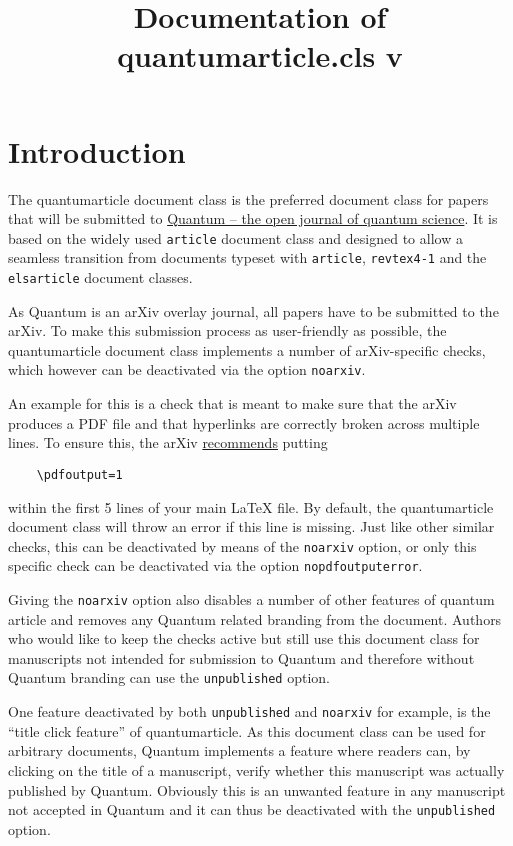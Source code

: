 \documentclass[a4paper,noarxiv,onecolumn]{quantumarticle}
\begin{document}
	\title{Documentation of quantumarticle.cls v\quantumarticleversion}
	\maketitle
	
	\tableofcontents
	
	\clearpage
	
	\section{Introduction}
	The quantumarticle document class is the preferred document class for papers that will be submitted to \href{https://quantum-journal.org/}{Quantum -- the open journal of quantum science}. It is based on the widely used \texttt{article} document class and designed to allow a seamless transition from documents typeset with \texttt{article}, \texttt{revtex4-1} and the \texttt{elsarticle} document classes. 
	
	As Quantum is an arXiv overlay journal, all papers have to be submitted to the arXiv. To make this submission process as user-friendly as possible, the quantumarticle document class implements a number of arXiv-specific checks, which however can be deactivated via the option \texttt{noarxiv}.

        An example for this is a check that is meant to make sure that the arXiv produces a PDF file and that hyperlinks are correctly broken across multiple lines.
        To ensure this, the arXiv \href{https://arxiv.org/help/submit_tex}{recommends} putting 
	\begin{verbatim}
	\pdfoutput=1
	\end{verbatim}
	within the first 5 lines of your main LaTeX file. By default, the quantumarticle document class will throw an error if this line is missing. Just like other similar checks, this can be deactivated by means of the \texttt{noarxiv} option, or only this specific check can be deactivated via the option \texttt{nopdfoutputerror}.

        Giving the \texttt{noarxiv} option also disables a number of other features of quantum article and removes any Quantum related branding from the document. Authors who would like to keep the checks active but still use this document class for manuscripts not intended for submission to Quantum and therefore without Quantum branding can use the \texttt{unpublished} option.

        One feature deactivated by both \texttt{unpublished} and \texttt{noarxiv} for example, is the ``title click feature'' of quantumarticle. As this document class can be used for arbitrary documents, Quantum implements a feature where readers can, by clicking on the title of a manuscript, verify whether this manuscript was actually published by Quantum. Obviously this is an unwanted feature in any manuscript not accepted in Quantum and it can thus be deactivated with the \texttt{unpublished} option.
        
\end{document}
